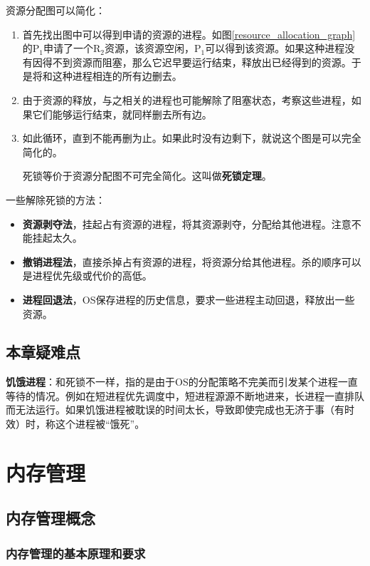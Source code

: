 \documentclass[12pt, a4paper, oneside]{ctexart}
\begin{document}
资源分配图可以简化：
\begin{enumerate}
  \item 首先找出图中可以得到申请的资源的进程。如图\ref{resource_allocation_graph}的P$_1$申请了一个R$_2$资源，该资源空闲，P$_1$可以得到该资源。如果这种进程没有因得不到资源而阻塞，那么它迟早要运行结束，释放出已经得到的资源。于是将和这种进程相连的所有边删去。
  \item 由于资源的释放，与之相关的进程也可能解除了阻塞状态，考察这些进程，如果它们能够运行结束，就同样删去所有边。
  \item 如此循环，直到不能再删为止。如果此时没有边剩下，就说这个图是可以完全简化的。
  
  死锁等价于资源分配图不可完全简化。这叫做\textbf{死锁定理}。
\end{enumerate}

一些解除死锁的方法：
\begin{itemize}
  \item {\bf 资源剥夺法}，挂起占有资源的进程，将其资源剥夺，分配给其他进程。注意不能挂起太久。
  \item {\bf 撤销进程法}，直接杀掉占有资源的进程，将资源分给其他进程。杀的顺序可以是进程优先级或代价的高低。
  \item {\bf 进程回退法}，OS保存进程的历史信息，要求一些进程主动回退，释放出一些资源。
\end{itemize}

\subsection{本章疑难点}

\textbf{饥饿进程}：和死锁不一样，指的是由于OS的分配策略不完美而引发某个进程一直等待的情况。例如在短进程优先调度中，短进程源源不断地进来，长进程一直排队而无法运行。如果饥饿进程被耽误的时间太长，导致即使完成也无济于事（有时效）时，称这个进程被“饿死”。

\section{内存管理}

\subsection{内存管理概念}

\subsubsection{内存管理的基本原理和要求}
\end{document}
